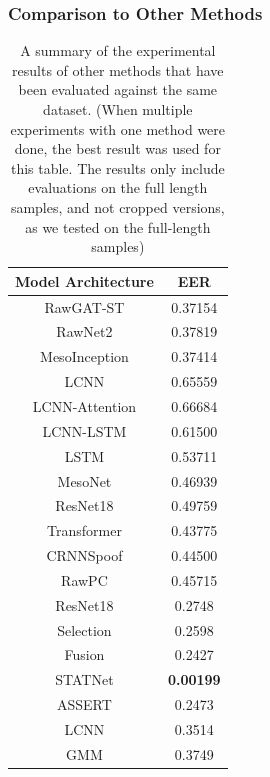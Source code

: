 \documentclass{article}
\begin{document}
		\subsubsection{Comparison to Other Methods}
			\begin{table}
				\caption{A summary of the experimental results of other methods that have been
				evaluated against the same dataset. (When multiple experiments with one method
				were done, the best result was used for this table. The results only include
				evaluations on the full length samples, and not cropped versions, as we tested on
				the full-length samples)}
				\vspace{10pt}
				\centering
				\begin{tabular}{c | c}
					\hline
					Model Architecture & EER \\
					\hline
					RawGAT-ST \cite{muller_does_2022} & 0.37154 \\
					RawNet2 \cite{muller_does_2022} & 0.37819 \\
					MesoInception \cite{muller_does_2022} & 0.37414 \\
					LCNN \cite{muller_does_2022} & 0.65559 \\
					LCNN-Attention \cite{muller_does_2022} & 0.66684 \\
					LCNN-LSTM \cite{muller_does_2022} & 0.61500 \\
					LSTM \cite{muller_does_2022} & 0.53711 \\
					MesoNet \cite{muller_does_2022} & 0.46939 \\
					ResNet18 \cite{muller_does_2022} & 0.49759 \\
					Transformer \cite{muller_does_2022} & 0.43775 \\
					CRNNSpoof \cite{muller_does_2022} & 0.44500 \\
					RawPC \cite{muller_does_2022} & 0.45715 \\
					ResNet18 \cite{yang_robust_2024} & 0.2748 \\
					Selection \cite{yang_robust_2024} & 0.2598 \\
					Fusion \cite{yang_robust_2024} & 0.2427 \\
					STATNet \cite{ranjan_statnet_2022} & \textbf{0.00199} \\
					ASSERT \cite{yi_audio_2023} & 0.2473 \\
					LCNN \cite{yi_audio_2023} & 0.3514 \\
					GMM \cite{yi_audio_2023} & 0.3749 \\
				\end{tabular}
				\label{table:other_results}
			\end{table}
\end{document}
